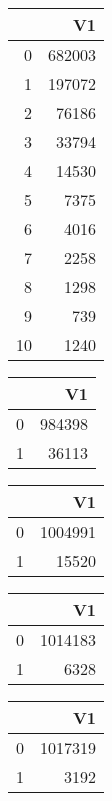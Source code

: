 \bigskip\bigskip
\centering
\begin{tabular}{rr}
  \hline
 & V1 \\ 
  \hline
0 & 682003 \\ 
  1 & 197072 \\ 
  2 & 76186 \\ 
  3 & 33794 \\ 
  4 & 14530 \\ 
  5 & 7375 \\ 
  6 & 4016 \\ 
  7 & 2258 \\ 
  8 & 1298 \\ 
  9 & 739 \\ 
  10 & 1240 \\ 
   \hline
\end{tabular}

\bigskip\bigskip
\centering
\begin{tabular}{rr}
  \hline
 & V1 \\ 
  \hline
0 & 984398 \\ 
  1 & 36113 \\ 
   \hline
\end{tabular}

\bigskip\bigskip
\centering
\begin{tabular}{rr}
  \hline
 & V1 \\ 
  \hline
0 & 1004991 \\ 
  1 & 15520 \\ 
   \hline
\end{tabular}

\bigskip\bigskip
\centering
\begin{tabular}{rr}
  \hline
 & V1 \\ 
  \hline
0 & 1014183 \\ 
  1 & 6328 \\ 
   \hline
\end{tabular}

\bigskip\bigskip
\centering
\begin{tabular}{rr}
  \hline
 & V1 \\ 
  \hline
0 & 1017319 \\ 
  1 & 3192 \\ 
   \hline
\end{tabular}

